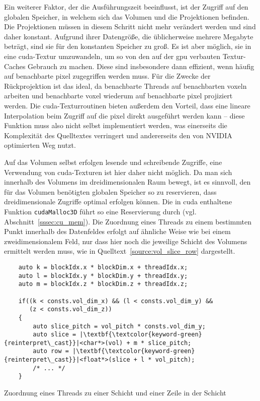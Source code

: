 Ein weiterer Faktor, der die Ausführungszeit beeinflusst, ist der Zugriff auf den globalen Speicher, in welchem sich
das Volumen und die Projektionen befinden. Die Projektionen müssen in diesem Schritt nicht mehr verändert werden und
sind daher konstant. Aufgrund ihrer Datengröße, die üblicherweise mehrere Megabyte beträgt, sind sie für den konstanten
Speicher zu groß. Es ist aber möglich, sie in eine \gls{cuda}-Textur umzuwandeln, um so von den auf der \gls{gpu}
verbauten Textur-Caches Gebrauch zu machen. Diese sind insbesondere dann effizient, wenn häufig auf benachbarte
\gls{pixel} zugegriffen werden muss. Für die Zwecke der Rückprojektion ist das ideal, da benachbarte Threads auf
benachbarten \gls{voxel}n arbeiten und benachbarte \gls{voxel} wiederum auf benachbarte \gls{pixel} projiziert werden.
Die \gls{cuda}-Texturroutinen bieten außerdem den Vorteil, dass eine lineare Interpolation beim Zugriff auf die
\gls{pixel} direkt ausgeführt werden kann -- diese Funktion muss also nicht selbst implementiert werden, was einerseits
die Komplexität des Quelltextes verringert und andererseits den von NVIDIA{\textregistered} optimierten Weg nutzt.

Auf das Volumen selbst erfolgen lesende und schreibende Zugriffe, eine Verwendung von \gls{cuda}-Texturen ist hier daher
nicht möglich. Da man sich innerhalb des Volumens im dreidimensionalen Raum bewegt, ist es sinnvoll, den für das Volumen
benötigten globalen Speicher so zu reservieren, dass dreidimensionale Zugriffe optimal erfolgen können. Die in
\gls{cuda} enthaltene Funktion \texttt{cudaMalloc3D} führt so eine Reservierung durch (vgl.
Abschnitt~\ref{sssec:cu_mem}). Die Zuordnung eines Threads zu einem bestimmten Punkt innerhalb des Datenfeldes erfolgt
auf ähnliche Weise wie bei einem zweidimensionalem Feld, nur dass hier noch die jeweilige Schicht des Volumens ermittelt
werden muss, wie in Quelltext~\ref{source:vol_slice_row} dargestellt.

\begin{code}
\begin{verbatim}
    auto k = blockIdx.x * blockDim.x + threadIdx.x;
    auto l = blockIdx.y * blockDim.y + threadIdx.y;
    auto m = blockIdx.z * blockDim.z + threadIdx.z;

    if((k < consts.vol_dim_x) && (l < consts.vol_dim_y) &&
       (z < consts.vol_dim_z))
    {
        auto slice_pitch = vol_pitch * consts.vol_dim_y;
        auto slice = |\textbf{\textcolor{keyword-green}{reinterpret\_cast}}|<char*>(vol) + m * slice_pitch;
        auto row = |\textbf{\textcolor{keyword-green}{reinterpret\_cast}}|<float*>(slice + l * vol_pitch);
        /* ... */
    }    
\end{verbatim}
\caption{Zuordnung eines Threads zu einer Schicht und einer Zeile in der Schicht}
\label{source:vol_slice_row}
\end{code}

